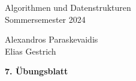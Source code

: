 \documentclass[11pt]{scrartcl}
\newcommand{\sheetNum}{7} %
\newcommand{\studentOne}{Alexandros Paraskevaidis} %
\newcommand{\studentTwo}{Elias Gestrich} %
\begin{document}
\begin{small}
\begin{minipage}{0.5 \linewidth}
  Algorithmen und Datenstrukturen\\
  Sommersemester 2024
\end{minipage}
\begin{minipage}{0.5\linewidth}
  \begin{flushright}
    \studentOne\\
    \studentTwo
  \end{flushright}
\end{minipage}
\end{small}
\begin{center}
\begin{sffamily}\Large\bfseries \sheetNum. Übungsblatt\end{sffamily}
\end{center}
\end{document}
